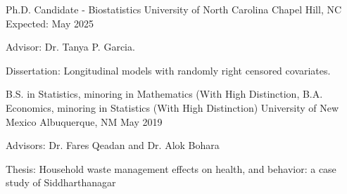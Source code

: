 

\begin{cventries}

  \cventry
    {Ph.D. Candidate - Biostatistics} %
    {University of North Carolina} %
    {Chapel Hill, NC} %
    {Expected: May 2025} %
    {
      \begin{cvitems} %
        \item Advisor: Dr. Tanya P. Garcia.
        \item Dissertation: Longitudinal models with randomly right censored covariates.
      \end{cvitems}
    }

  \cventry
    {B.S. in Statistics, minoring in Mathematics (With High Distinction, \newline B.A. Economics, minoring in Statistics (With High Distinction)} %
    {University of New Mexico} %
    {Albuquerque, NM} %
    {May 2019} %
    {
      \begin{cvitems} %
        \item {Advisors: Dr. Fares Qeadan and Dr. Alok Bohara}
        \item Thesis: Household waste management effects on health, and behavior: a case study of Siddharthanagar
      \end{cvitems}
    }

\end{cventries}
